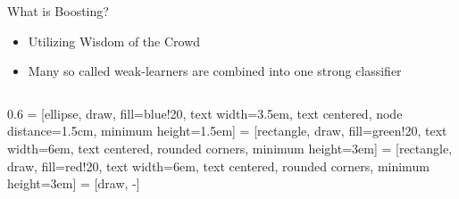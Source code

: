\documentclass{beamer}
\begin{document}
\begin{frame}{What is Boosting?}
    \centering
    \begin{itemize}
        \item Utilizing Wisdom of the Crowd
        \item Many so called weak-learners are combined into one strong classifier
    \end{itemize}
    \bigbreak
    \begin{center}
        \begin{columns}
            \begin{column}{0.6\hsize}
                \centering
                 = [ellipse, draw, fill=blue!20,
                text width=3.5em, text centered, node distance=1.5cm, minimum height=1.5em]
                 = [rectangle, draw, fill=green!20,
                text width=6em, text centered, rounded corners, minimum height=3em]
                 = [rectangle, draw, fill=red!20,
                text width=6em, text centered, rounded corners, minimum height=3em]
                 = [draw, -]

\end{column}
\end{columns}
\end{center}
\end{frame}
\end{document}
